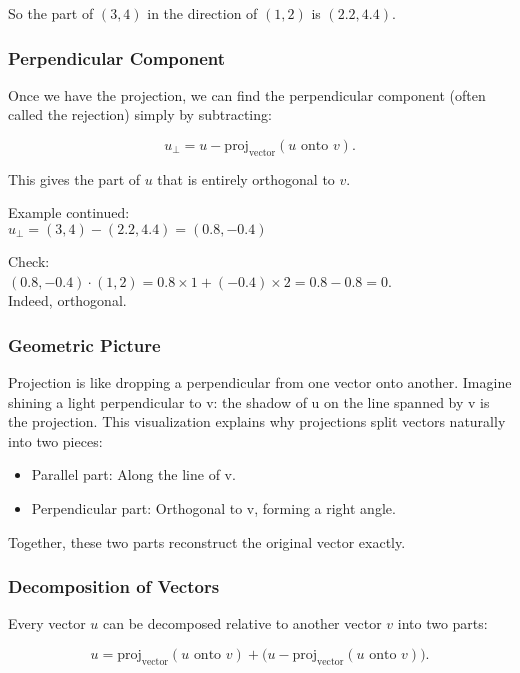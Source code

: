 \documentclass[
  letterpaper,
  DIV=11,
  numbers=noendperiod]{scrreprt}
\providecommand{\tightlist}{%
  \setlength{\itemsep}{0pt}\setlength{\parskip}{0pt}}
\begin{document}
So the part of \((3, 4)\) in the direction of \((1, 2)\) is
\((2.2, 4.4)\).

\subsubsection{Perpendicular Component}\label{perpendicular-component}

Once we have the projection, we can find the perpendicular component
(often called the rejection) simply by subtracting:

\[
u_{\perp} = u - \text{proj}_{\text{vector}}(u \text{ onto } v).
\]

This gives the part of \(u\) that is entirely orthogonal to \(v\).

Example continued:\\
\(u_{\perp} = (3, 4) - (2.2, 4.4) = (0.8, -0.4)\)

Check:\\
\((0.8, -0.4) \cdot (1, 2) = 0.8 \times 1 + (-0.4) \times 2 = 0.8 - 0.8 = 0\).\\
Indeed, orthogonal.

\subsubsection{Geometric Picture}\label{geometric-picture}

Projection is like dropping a perpendicular from one vector onto
another. Imagine shining a light perpendicular to v: the shadow of u on
the line spanned by v is the projection. This visualization explains why
projections split vectors naturally into two pieces:

\begin{itemize}
\tightlist
\item
  Parallel part: Along the line of v.
\item
  Perpendicular part: Orthogonal to v, forming a right angle.
\end{itemize}

Together, these two parts reconstruct the original vector exactly.

\subsubsection{Decomposition of Vectors}\label{decomposition-of-vectors}

Every vector \(u\) can be decomposed relative to another vector \(v\)
into two parts:

\[
u = \text{proj}_{\text{vector}}(u \text{ onto } v) + \big(u - \text{proj}_{\text{vector}}(u \text{ onto } v)\big).
\]
\end{document}
